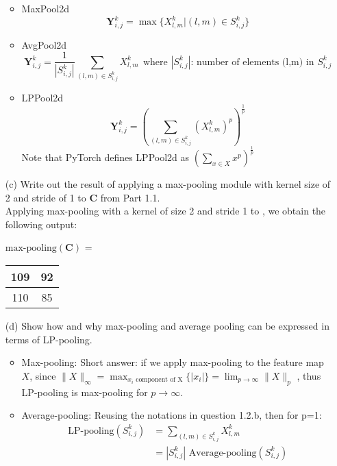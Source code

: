 \documentclass[11pt]{article}
\newcommand{\0}{\mat{0}}
\newcommand{\matr}[1]{\bm{#1}}     %
\begin{document}
\begin{itemize}
	\begin{itemize}
		\item MaxPool2d
		\[
			\matr{Y}^k_{i,j} = \max \{ X^k_{l,m}| (l,m) \in  S^{k}_{i,j} \}
		\]
		\item AvgPool2d
		\[
			\matr{Y}^k_{i,j} = \frac{1}{|  S^{k}_{i,j} |} \sum_{(l,m) \in  S^{k}_{i,j}} X^k_{l,m} ~~  \text{where } |  S^{k}_{i,j} | \text{: number of elements (l,m) in } S^{k}_{i,j}
		\]	
		\item LPPool2d
		\[
			\matr{Y}^k_{i,j} =   (\sum_{(l,m) \in  S^{k}_{i,j}} (X^k_{l,m})^p)^{\frac{1}{p}}
		\]	
		Note that PyTorch defines LPPool2d as $(\sum_{x \in X} x^p)^{\frac{1}{p}}$
		
	\end{itemize}
        
    
    \item[(c)] Write out the result of applying a max-pooling module with kernel size of 2 and stride of 1 to $\matr{C}$ from Part 1.1.\\
    \smallskip
    Applying max-pooling with a kernel of size 2 and stride 1 to , we obtain the following output:
    
    	    \begin{table}[!ht]
		    \centering
    		$\text{max-pooling} (\matr{C})$ = \begin{tabular}{|c|c|} 
    			\hline
			109 & 92 \\ \hline 
		        110 & 85 \\ \hline
   		 \end{tabular}
    	  \end{table}

    
    \item[(d)] Show how and why max-pooling and average pooling can be expressed in terms of LP-pooling.\\
    \smallskip
    	\begin{itemize}
		\item Max-pooling:
		    Short answer: if we apply max-pooling to the feature map $X$, 
    		    since $ \|X\|_{\infty}  = \max_{x_i \text{ component of X}}  \{ |x_i| \} = \lim_{p \to \infty} \|X\|_p$ , thus LP-pooling is max-pooling for $p \to \infty$.
		\item Average-pooling:
		Reusing the notations in question 1.2.b, then for p=1:
		\begin{align*}
			\text{LP-pooling} (S^k_{i,j})  &=  \sum_{(l,m) \in  S^{k}_{i,j}} X^k_{l,m} \\
						&= |  S^{k}_{i,j} | \text{ Average-pooling}(S^k_{i,j})
		\end{align*}
		   
 	\end{itemize}   
\end{itemize}
\end{document}
